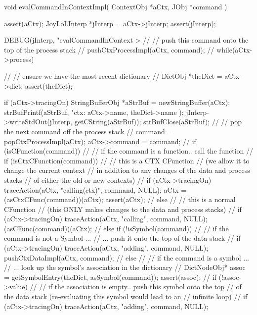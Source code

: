 \startCCode
void evalCommandInContextImpl(
  ContextObj *aCtx,
  JObj   *command
) {
  assert(aCtx);
  JoyLoLInterp *jInterp = aCtx->jInterp;
  assert(jInterp);

  DEBUG(jInterp, "evalCommandInContext > %
  //
  // push this command onto the top of the process stack
  //
  pushCtxProcessImpl(aCtx, command);
  //
  while(aCtx->process) {
    //
    // ensure we have the most recent dictionary
    //
    DictObj *theDict = aCtx->dict;
    assert(theDict);
    
    if (aCtx->tracingOn) {
      StringBufferObj *aStrBuf = newStringBuffer(aCtx);
      strBufPrintf(aStrBuf,
        "\n ctx: %
        aCtx->name, theDict->name
      );
      jInterp->writeStdOut(jInterp, getCString(aStrBuf));
      strBufClose(aStrBuf);
    }
    //
    // pop the next command off the process stack
    //
    command = popCtxProcessImpl(aCtx);
    aCtx->command = command;
    //
    if (isCFunction(command)) {
      //
      // if the command is a function.. call the function
      //
      if (isCtxCFunction(command)) {
        //
        // this is a CTX CFunction
        // (we allow it to change the current context
        //  in addition to any changes of the data and process stacks
        //  of either the old or new contexts)
        //
        if (aCtx->tracingOn) 
          traceAction(aCtx, "calling(ctx)", command, NULL);
        aCtx = (asCtxCFunc(command))(aCtx);
        assert(aCtx);
        //
      } else {
        //
        // this is a normal CFunction
        // (this ONLY makes changes to the data and process stacks)
        //
        if (aCtx->tracingOn) 
          traceAction(aCtx, "calling", command, NULL);
        (asCFunc(command))(aCtx);
        //
      }
    } else if (!isSymbol(command)) {
      //
      // if the command is not a Symbol ...
      //  ...  push it onto the top of the data stack
      //
      if (aCtx->tracingOn)
        traceAction(aCtx, "adding", command, NULL);
      pushCtxDataImpl(aCtx, command);
      //
    } else {
      //
      // if the command is a symbol ...
      //  ... look up the symbol's association in the dictionary
      //
      DictNodeObj* assoc = getSymbolEntry(theDict, asSymbol(command));
      assert(assoc);
      //
      if (!assoc->value) {
        //
        // if the association is empty.. push this symbol onto the top
        // of the data stack (re-evaluating this symbol would lead to an
        // infinite loop)
        //
        if (aCtx->tracingOn)
          traceAction(aCtx, "adding", command, NULL);
}}}}
